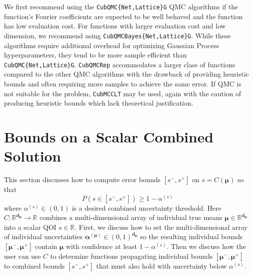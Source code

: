 \documentclass[graybox]{svmult}
\begin{document}
We first recommend using the  \texttt{CubQMC\{Net,Lattice\}G} QMC algorithms if the function's Fourier coefficients are expected to be well behaved and the function has low evaluation cost. For functions with larger evaluation cost and low dimension, we recommend using  \texttt{CubQMCBayes\{Net,Lattice\}G}. While these algorithms require additional overhead for optimizing Gaussian Process hyperparameters, they tend to be more sample efficient than \texttt{CubQMC\{Net,Lattice\}G}. \texttt{CubQMCRep} accommodates a larger class of functions compared to the other QMC algorithms with the drawback of providing heuristic bounds and often requiring more samples to achieve the same error. If QMC is not suitable for the problem, \texttt{CubMCCLT} may be used, again with the caution of producing heuristic bounds which lack theoretical justification.

\section{Bounds on a Scalar Combined Solution} \label{SoRa_sec:comb_sol_approx}

This section discusses how to compute error bounds $[s^-,s^+]$ on $s = C(\boldsymbol{\mu})$ so that 
\begin{equation}
    P(s \in [s^-,s^+]) \geq 1-\alpha^{(s)}
    \label{eq:scalar_comb_desired_ineq}
\end{equation}
where $\alpha^{(s)} \in (0,1)$ is a desired combined uncertainty threshold. Here $C: \mathbb{R}^{\boldsymbol{d}_{\boldsymbol{\mu}}} \to \mathbb{R}$ combines a multi-dimensional array of individual true means $\boldsymbol{\mu} \in \mathbb{R}^{\boldsymbol{d}_{\boldsymbol{\mu}}}$ into a scalar QOI $s \in \mathbb{R}$. First, we discuss how to set the multi-dimensional array of individual uncertainties $\boldsymbol{\alpha}^{(\boldsymbol{\mu})} \in (0,1)^{\boldsymbol{d}_{\boldsymbol{\mu}}}$ so the resulting individual bounds $[\boldsymbol{\mu}^-,\boldsymbol{\mu}^+]$ contain $\boldsymbol{\mu}$ with confidence at least $1-\alpha^{(s)}$. Then we discuss how the user can use $C$ to determine functions propagating individual bounds $[\boldsymbol{\mu}^-,\boldsymbol{\mu}^+]$ to combined bounds $[s^-,s^+]$ that must also hold with uncertainty below $\alpha^{(s)}$. 
\end{document}

